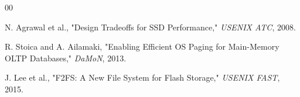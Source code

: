 \documentclass[conference]{IEEEtran}
\begin{document}
\begin{thebibliography}{00}

 N. Agrawal et al., "Design Tradeoffs for SSD Performance," \textit{USENIX ATC}, 2008.

 R. Stoica and A. Ailamaki, "Enabling Efficient OS Paging for Main-Memory OLTP Databases," \textit{DaMoN}, 2013.


 J. Lee et al., "F2FS: A New File System for Flash Storage," \textit{USENIX FAST}, 2015.

\end{thebibliography}
\end{document}
